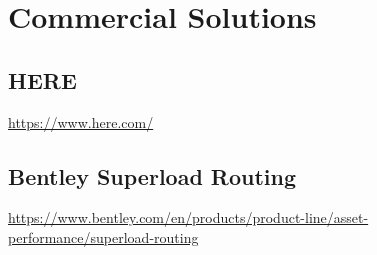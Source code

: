 \section{Commercial Solutions}

\subsection{HERE}
\url{https://www.here.com/}

\subsection{Bentley Superload Routing}
\url{https://www.bentley.com/en/products/product-line/asset-performance/superload-routing}
